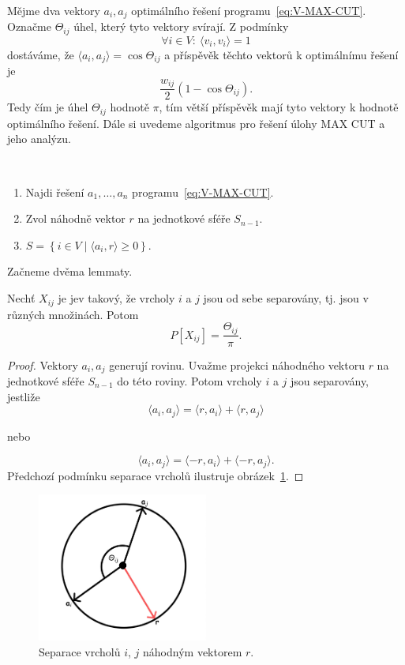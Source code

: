 Mějme dva vektory $a_i, a_j$ optimálního řešení programu~\ref{eq:V-MAX-CUT}. Označme $\Theta_{ij}$ úhel, který tyto vektory svírají. Z podmínky
$$
    \forall i \in V:\ \langle v_i, v_i \rangle = 1
$$
dostáváme, že $\langle a_i, a_j \rangle = \cos \Theta_{ij}$ a příspěvěk těchto vektorů k optimálnímu řešení je
$$
    \frac{w_{ij}}{2} (1 - \cos \Theta_{ij}).
$$
Tedy čím  je úhel $\Theta_{ij}$ hodnotě $\pi$, tím větší příspěvěk mají tyto vektory k hodnotě optimálního řešení. Dále si uvedeme algoritmus pro řešení úlohy MAX CUT a jeho analýzu.

\begin{alg}$ $
    \begin{enumerate}
        \item Najdi řešení $a_1, \dots, a_n$ programu~\ref{eq:V-MAX-CUT}.
        \item Zvol náhodně vektor $r$ na jednotkové sféře $S_{n-1}$.
        \item $S = \left\{ i \in V \mid \langle a_i, r \rangle \geq 0 \right\}$.
    \end{enumerate}
    \label{alg:max-cut}
\end{alg}

Začneme dvěma lemmaty.

\begin{lm}
    Nechť $X_{ij}$ je jev takový, že vrcholy $i$ a $j$ jsou od sebe separovány, tj. jsou v různých množinách. Potom
    $$
        P\left[ X_{ij} \right] = \frac{\Theta_{ij}}{\pi}.
    $$
    \label{lemma:sep}
\end{lm}

\begin{proof}
    Vektory $a_i, a_j$ generují rovinu. Uvažme projekci náhodného vektoru $r$ na jednotkové sféře $S_{n-1}$ do této roviny. Potom vrcholy $i$ a $j$ jsou separovány, jestliže
    $$
        \langle a_i, a_j \rangle = \langle r, a_i \rangle + \langle r, a_j \rangle
    $$
    \begin{center}
        nebo
    \end{center}
    $$
        \langle a_i, a_j \rangle = \langle -r, a_i \rangle + \langle -r, a_j \rangle.
    $$
    Předchozí podmínku separace vrcholů ilustruje obrázek~\ref{fig:lemma_plane}.
\end{proof}

\begin{figure}[h!]
    \centering
    \includegraphics[width=0.5\textwidth]{img/lemma_plane.png}   
    \caption{Separace vrcholů $i$, $j$ náhodným vektorem $r$.}
    \label{fig:lemma_plane}
\end{figure}


